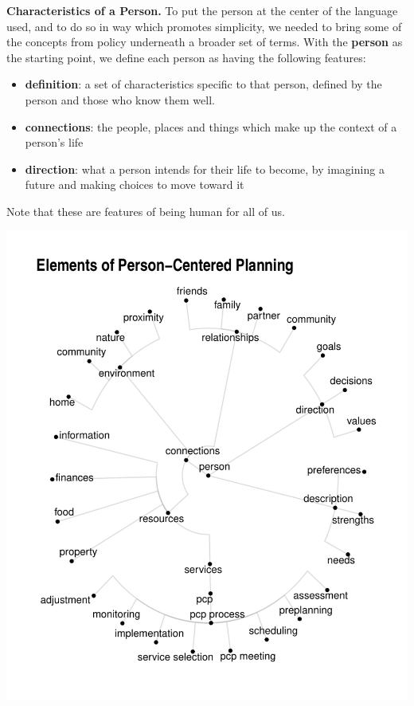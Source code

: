 \documentclass[
]{book}
\providecommand{\tightlist}{%
  \setlength{\itemsep}{0pt}\setlength{\parskip}{0pt}}
\begin{document}
\textbf{Characteristics of a Person.} To put the person at the center of the language used, and to do so in way which promotes simplicity, we needed to bring some of the concepts from policy underneath a broader set of terms. With the \textbf{person} as the starting point, we define each person as having the following features:

\begin{itemize}
\tightlist
\item
  \textbf{definition}: a set of characteristics specific to that person, defined by the person and those who know them well.
\item
  \textbf{connections}: the people, places and things which make up the context of a person's life
\item
  \textbf{direction}: what a person intends for their life to become, by imagining a future and making choices to move toward it
\end{itemize}

Note that these are features of being human for all of us.

\includegraphics{person_centered_files/figure-latex/unnamed-chunk-5-1.pdf}
\end{document}
